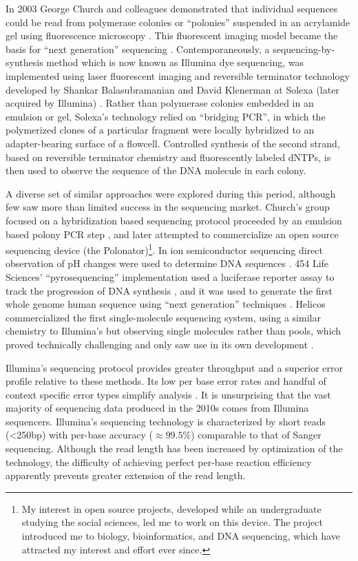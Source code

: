 In 2003 George Church and colleagues demonstrated that individual sequences could be read from polymerase colonies or ``polonies'' suspended in an acrylamide gel using fluorescence microscopy \cite{mitra2003fluorescent}.
This fluorescent imaging model became the basis for ``next generation'' sequencing \cite{shendure2008next}.
Contemporaneously, a sequencing-by-synthesis method which is now known as Illumina dye sequencing, was implemented using laser fluorescent imaging and reversible terminator technology developed by Shankar Balasubramanian and David Klenerman at Solexa (later acquired by Illumina) \cite{balasubramanian2004arrayed, bentley2008accurate}.
Rather than polymerase colonies embedded in an emulsion or gel, Solexa's technology relied on ``bridging PCR'', in which the polymerized clones of a particular fragment were locally hybridized to an adapter-bearing surface of a flowcell.
Controlled synthesis of the second strand, based on reversible terminator chemistry \cite{canard1994dna} and fluorescently labeled dNTPs, is then used to observe the sequence of the DNA molecule in each colony.

A diverse set of similar approaches were explored during this period, although few saw more than limited success in the sequencing market.
Church's group focused on a hybridization based sequencing protocol proceeded by an emulsion based polony PCR step \cite{shendure2005accurate}, and later attempted to commercialize an open source sequencing device (the Polonator)\footnote{My interest in open source projects, developed while an undergraduate studying the social sciences, led me to work on this device. The project introduced me to biology, bioinformatics, and DNA sequencing, which have attracted my interest and effort ever since.}.
In ion semiconductor sequencing direct observation of pH changes were used to determine DNA sequences \cite{rusk2010torrents}.
454 Life Sciences' ``pyrosequencing'' implementation used a luciferase reporter assay to track the progression of DNA synthesis \cite{margulies2005genome}, and it was used to generate the first whole genome human sequence using ``next generation'' techniques \cite{wheeler2008complete}.
Helicos commercialized the first single-molecule sequencing system, using a similar chemistry to Illumina's but observing single molecules rather than pools, which proved technically challenging and only saw use in its own development \cite{harris2008single}.

Illumina's sequencing protocol provides greater throughput and a superior error profile relative to these methods.
Its low per base error rates and handful of context specific error types simplify analysis \cite{allhoff2013discovering}.
It is unsurprising that the vast majority of sequencing data produced in the 2010s comes from Illumina sequencers.
Illumina's sequencing technology is characterized by short reads (<250bp) with per-base accuracy ($\approx 99.5\%$) comparable to that of Sanger sequencing.
Although the read length has been increased by optimization of the technology, the difficulty of achieving perfect per-base reaction efficiency apparently prevents greater extension of the read length.

